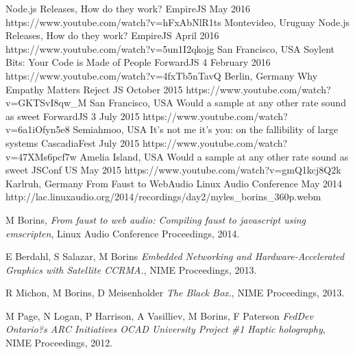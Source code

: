 \documentclass[10pt,a4paper,sans]{moderncv}   %
\begin{document}
  {Node.js Releases, How do they work?}
  {EmpireJS}
  {May 2016}{}
  {https://www.youtube.com/watch?v=hFxAbNlR1ts}
\cventry
  {Montevideo, Uruguay}
  {Node.js Releases, How do they work?}
  {EmpireJS}
  {April 2016}{}
  {https://www.youtube.com/watch?v=5un1I2qkojg}
\cventry
  {San Francisco, USA}
  {Soylent Bits: Your Code is Made of People}
  {ForwardJS 4}
  {February 2016}{}
  {https://www.youtube.com/watch?v=4fxTb5nTavQ}
\cventry
  {Berlin, Germany}
  {Why Empathy Matters}
  {Reject JS}
  {October 2015}{}
  {https://www.youtube.com/watch?v=GKTSvI8qw\_M}
\cventry
  {San Francisco, USA}
  {Would a sample at any other rate sound as sweet}
  {ForwardJS 3}
  {July 2015}{}
  {https://www.youtube.com/watch?v=6a1iOfyn5e8}
\cventry
  {Semiahmoo, USA}
  {It's not me it's you: on the fallibility of large systems}
  {CascadiaFest}
  {July 2015}{}
  {https://www.youtube.com/watch?v=47XMs6pcf7w}
\cventry
  {Amelia Island, USA}
  {Would a sample at any other rate sound as sweet}
  {JSConf US}
  {May 2015}{}
  {https://www.youtube.com/watch?v=gmQ1kcj8Q2k}
\cventry
  {Karlruh, Germany}
  {From Faust to WebAudio}
  {Linux Audio Conference}
  {May 2014}{}
  {http://lac.linuxaudio.org/2014/recordings/day2/myles\_borins\_360p.webm}

\begin{thebibliography}{9}

  M Borins,
  \textit{From faust to web audio: Compiling faust to javascript using emscripten},
  Linux Audio Conference Proceedings,
  2014.

  E Berdahl, S Salazar, M Borins
  \textit{Embedded Networking and Hardware-Accelerated Graphics with Satellite CCRMA.},
  NIME Proceedings,
  2013.

  R Michon, M Borins, D Meisenholder
  \textit{The Black Box.},
  NIME Proceedings,
  2013.

  M Page, N Logan, P Harrison, A Vasilliev, M Borins, F Paterson
  \textit{FedDev Ontario?s ARC Initiatives OCAD University Project \#1 Haptic holography},
  NIME Proceedings,
  2012.

\end{thebibliography}

\end{document}
